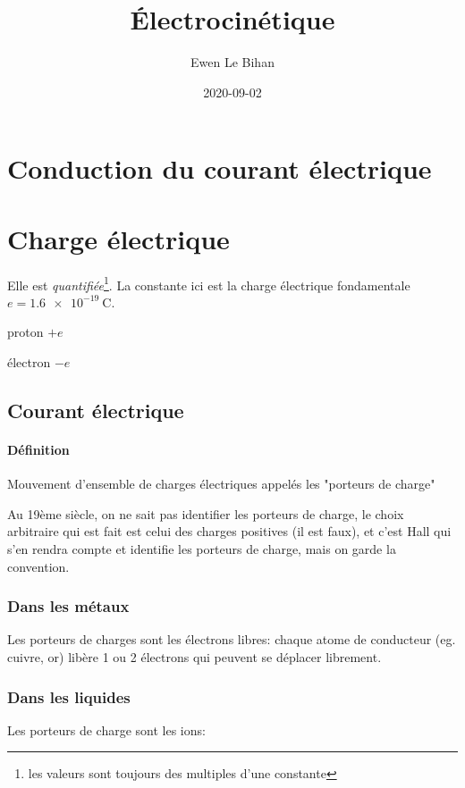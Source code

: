 \documentclass{article}
\title{Électrocinétique}
\date{2020-09-02}
\author{Ewen Le Bihan}
\newenvironment{definition}{\begin{description}[leftmargin=!,labelwidth=\widthof{\bfseries Lorem ipsum dolor}]}{\end{description}}
\begin{document}
\maketitle

\section{Conduction du courant électrique}
\section{Charge électrique}
Elle est \emph{quantifiée}\footnote{les valeurs sont toujours des multiples d'une constante}. La constante ici est la charge électrique fondamentale $e = \SI{1.6e-19}{\coulomb}$.

\begin{definition}
	\item[proton] $+e$
	\item[électron] $-e$
\end{definition}

\subsection{Courant électrique}
\paragraph{Définition} Mouvement d'ensemble de charges électriques appelés les "porteurs de charge"


Au 19ème siècle, on ne sait pas identifier les porteurs de charge, le choix arbitraire qui est fait est celui des charges positives (il est faux), et c'est Hall qui s'en rendra compte et identifie les porteurs de charge, mais on garde la convention.

\subsubsection{Dans les métaux}
Les porteurs de charges sont les électrons libres: chaque atome de conducteur (eg. cuivre, or) libère 1 ou 2 électrons qui peuvent se déplacer librement.

\subsubsection{Dans les liquides}
Les porteurs de charge sont les ions:
\end{document}
